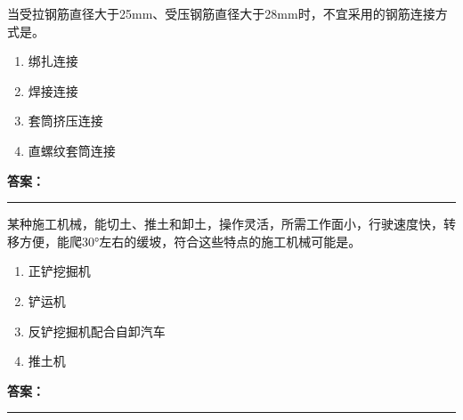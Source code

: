 \documentclass[UTF8,fontset=fandol,11pt]{ctexart}
\newcommand{\answerline}{\textcolor{answerred}{\rule{2.4cm}{0.7pt}}}
\begin{document}
\begin{quizbox}[title={乱序第 23 题｜第四章混凝土结构工程}]

当受拉钢筋直径大于25mm、受压钢筋直径大于28mm时，不宜采用的钢筋连接方式是。\\

\begin{enumerate}[label=\Alph*.]

\item 绑扎连接

\item 焊接连接

\item 套筒挤压连接

\item 直螺纹套筒连接

\end{enumerate}

\textbf{\textcolor{answerred}{答案：}} \answerline

\end{quizbox}

\vspace{0.2em}

\begin{quizbox}[title={乱序第 24 题｜第一章土方工程}]

某种施工机械，能切土、推土和卸土，操作灵活，所需工作面小，行驶速度快，转移方便，能爬30°左右的缓坡，符合这些特点的施工机械可能是。\\

\begin{enumerate}[label=\Alph*.]

\item 正铲挖掘机

\item 铲运机

\item 反铲挖掘机配合自卸汽车

\item 推土机

\end{enumerate}

\textbf{\textcolor{answerred}{答案：}} \answerline

\end{quizbox}

\vspace{0.2em}
\end{document}
